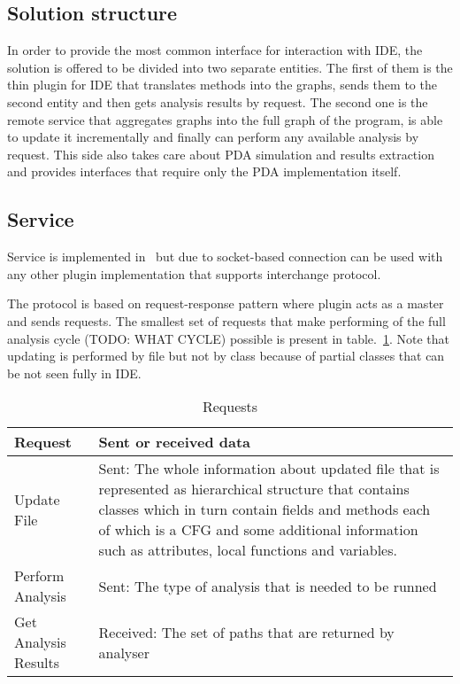 \subsection{Solution structure}

In order to provide the most common interface for interaction with IDE, the solution is offered to be divided into two separate entities.
The first of them is the thin plugin for IDE that translates methods into the graphs, sends them to the second entity and then gets analysis results by request.
The second one is the remote service that aggregates graphs into the full graph of the program, is able to update it incrementally and finally can perform any available analysis by request.
This side also takes care about PDA simulation and results extraction and provides interfaces that require only the PDA implementation itself.

\subsection{Service}

Service is implemented in \CS \ but due to socket-based connection can be used with any other plugin implementation that supports interchange protocol.

The protocol is based on request-response pattern where plugin acts as a master and sends requests.
The smallest set of requests that make performing of the full analysis cycle (TODO: WHAT CYCLE) possible is present in table.~\ref{fig:requests}.
Note that updating is performed by file but not by class because of partial classes that can be not seen fully in IDE.

\begin{table}[h]
	\begin{tabular}{|p{40pt}|p{\linewidth - 52pt}|}
	\hline
	Request              & Sent or received data \\ \hline
	Update File          & Sent: The whole information about updated file that is represented as hierarchical structure that contains classes which in turn contain fields and methods each of which is a CFG and some additional information such as attributes, local functions and variables. \\ \hline
	Perform Analysis     & Sent: The type of analysis that is needed to be runned \\ \hline
	Get Analysis Results & Received: The set of paths that are returned by analyser \\ \hline
	\end{tabular}
	\caption{Requests}
	\label{fig:requests}
\end{table}

